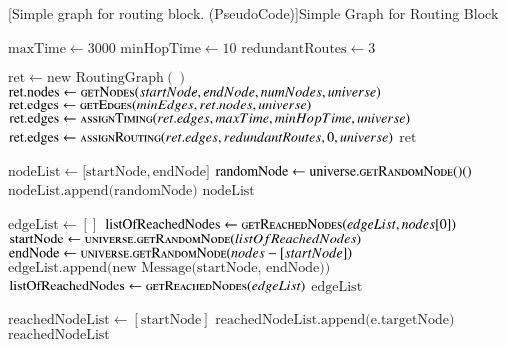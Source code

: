 \begin{breakablealgorithm}
	[Simple graph for routing block. (PseudoCode)]{Simple Graph for Routing Block}\label{alg:simpleGraph}
	\begin{algorithmic}[1]
		\label{alg:getRoutingGraph-line}
		\State $\text{maxTime} \gets 3000$
		\State $\text{minHopTime} \gets 10$
		\State $\text{redundantRoutes} \gets 3$
		\item[]
		\State $\text{ret} \gets \text{new RoutingGraph}()$
		\State $\text{ret.nodes} \gets \Call{getNodes}{startNode, endNode, numNodes, universe}$
		\State $\text{ret.edges} \gets \Call{getEdges}{minEdges, ret.nodes, universe}$
		\State $\text{ret.edges} \gets \Call{assignTiming}{ret.edges, maxTime, minHopTime, universe}$
		\State $\text{ret.edges} \gets \Call{assignRouting}{ret.edges, redundantRoutes, 0, universe}$
		\Return $\text{ret}$	
		\EndFunction
		\item[]		
		\label{alg:getNodes-line}
		\State $\text{nodeList} \gets \lbrack\text{startNode}, \text{endNode}\rbrack$
		\State $\text{randomNode} \gets \text{universe}.\Call{getRandomNode()}$
		\State $\text{nodeList.append(randomNode)}$ 
		\EndIf	
		\EndWhile{}	
		\Return $\text{nodeList}$
		\EndFunction  
		\item[]
		\label{alg:getEdges-line}
		\State $\text{edgeList} \gets []$
		\State $\text{listOfReachedNodes} \gets \Call{getReachedNodes}{edgeList, nodes[0]}$
		\State $\text{startNode} \gets \Call{universe.getRandomNode}{listOfReachedNodes}$
		\State $\text{endNode} \gets \Call{universe.getRandomNode}{nodes-[startNode]}$
		\State $\text{edgeList.append(new Message(startNode, endNode))}$
		\State $\text{listOfReachedNodes} \gets \Call{getReachedNodes}{edgeList}$
		\EndWhile{}
		\Return $\text{edgeList}$
		\EndFunction
		\item[]
		\label{alg:getReachedNodes-line}
		\State $\text{reachedNodeList} \gets [\text{startNode}]$
		\State $\text{reachedNodeList.append(e.targetNode)}$
		\EndIf
		\EndFor
		\Return $\text{reachedNodeList}$
		\EndFunction
	\end{algorithmic}
\end{breakablealgorithm}

